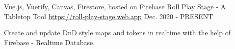 \begin{cventries}

\cventry
{Vue.js, Vuetify, Canvas, Firestore, hosted on Firebase} %
{Roll Play Stage - A Tabletop Tool} %
{\href{https://roll-play-stage.web.app}{https://roll-play-stage.web.app}} %
{Dec. 2020 - PRESENT} %
{ %
\begin{cvitems}
\item {Create and update DnD style maps and tokens in realtime with the help of Firebase - Realtime Database.}
\end{cvitems}
}


\end{cventries}